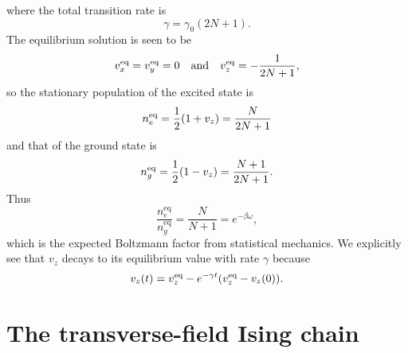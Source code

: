 \documentclass[../thesis.tex]{subfiles}
\begin{document}
where the total transition rate is
\begin{equation}
  \gamma
  = \gamma_0(2N + 1).
\end{equation}
The equilibrium solution is seen to be
\begin{equation}
  v_x^\text{eq}
  = v_y^\text{eq}
  = 0
  \qand
  v_z^\text{eq}
  = -\frac{1}{2N + 1},
\end{equation}
so the stationary population of the excited state is
\begin{equation}
  n_e^\text{eq}
  = \frac{1}{2}\qty(1 + v_z)
  = \frac{N}{2N + 1}
\end{equation}
and that of the ground state is
\begin{equation}
  n_g^\text{eq}
  = \frac{1}{2}\qty(1 - v_z)
  = \frac{N + 1}{2N + 1}.
\end{equation}
Thus
\begin{equation}
  \frac{n_e^\text{eq}}{n_g^\text{eq}}
  = \frac{N}{N + 1}
  = e^{-\beta\omega},
\end{equation}
which is the expected Boltzmann factor from statistical mechanics. We explicitly
see that $v_z$ decays to its equilibrium value with rate $\gamma$ because
\begin{equation}
  v_z(t)
  = v_z^\text{eq} - e^{-\gamma t}\qty(v_z^\text{eq} - v_z(0)).
\end{equation}


\section{The transverse-field Ising chain}
\end{document}
